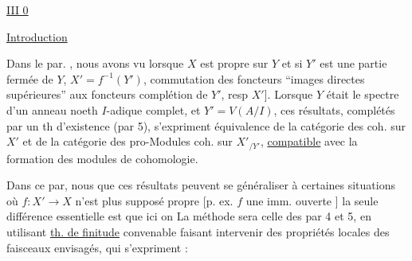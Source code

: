 
\uline{\uline{III} 0}

\uline{Introduction}

Dans le par. , nous avons vu  lorsque $X$ est propre sur $Y$     et si $Y'$ est une partie fermée de $Y$, $X'=f^{-1}(Y')$,   commutation des foncteurs  ``images directes supérieures'' aux foncteurs complétion  de $Y'$, resp $X'$]. Lorsque $Y$ était le spectre d'un anneau  noeth $I$-adique complet, et $Y'=V(A/I)$, ces résultats, complétés par un th d'existence (par 5), s'expriment     équivalence de la catégorie des   coh. sur $X'$ et de la catégorie des pro-Modules coh. sur $X'_{/Y'}$, \uline{compatible} avec la formation des modules de cohomologie.

Dans ce par, nous   que ces résultats peuvent se généraliser à certaines situations où $f:X'\to X$ n'est plus supposé propre [p. ex. $f$ une imm. ouverte ]  la seule différence essentielle est que  ici on 
La méthode sera  celle des par 4 et 5,  en utilisant   \uline{th. de finitude} convenable    faisant intervenir des propriétés   locales des faisceaux envisagés, qui s'expriment :


